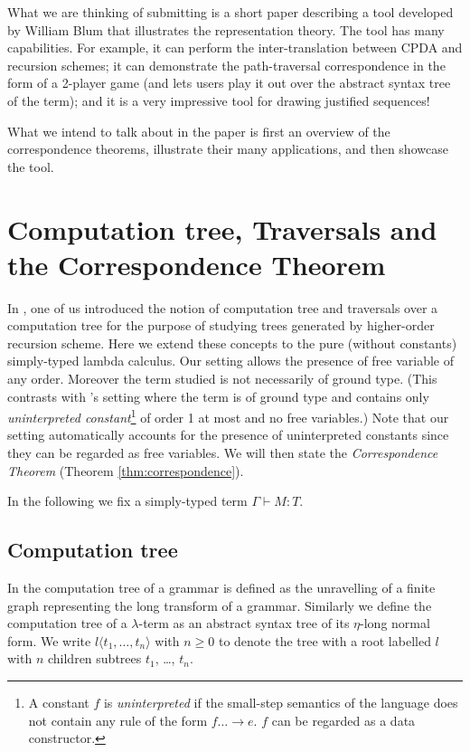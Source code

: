 What we are thinking of submitting is a short paper describing a tool developed by William Blum that illustrates the representation theory. The tool has many capabilities. For example, it can perform the inter-translation between CPDA and recursion schemes; it can demonstrate the path-traversal correspondence in the form of a 2-player game (and lets users play it out over the abstract syntax tree of the term); and it is a very impressive tool for drawing justified sequences!

What we intend to talk about in the paper is first an overview of the correspondence theorems, illustrate their many applications, and then showcase the tool.

\section{Computation tree, Traversals and the Correspondence Theorem}

In \cite{OngLics2006}, one of us introduced the notion of computation tree and traversals over a computation tree for the purpose of studying trees generated by higher-order recursion scheme. Here we extend these concepts to the pure (\ie without constants) simply-typed lambda calculus. Our setting allows the presence of free variable of any order. Moreover the term studied is not necessarily of ground type. (This contrasts with \cite{OngLics2006}'s setting where the term is of ground type and contains only \emph{uninterpreted constant}\footnote{A constant $f$ is  \emph{uninterpreted} if the small-step semantics of the language
  does not contain any rule of the form $f \dots \rightarrow e$. $f$
  can be regarded as a data constructor.} of order 1 at most and no
free variables.) Note that our setting automatically accounts for the presence of uninterpreted constants since they can be regarded as free variables. We will then state the \emph{Correspondence Theorem} (Theorem \ref{thm:correspondence}).

In the following we fix a simply-typed term $\Gamma \vdash M :T$.

\subsection{Computation tree}
 In \cite{OngLics2006} the computation tree of a grammar is
defined as the unravelling of a finite graph representing the long transform of a grammar. Similarly we define the computation tree of a $\lambda$-term as an abstract syntax tree of its $\eta$-long normal form.  We write $l\langle t_1, \ldots, t_n \rangle$ with $n \geq 0$ to denote the tree with a root labelled $l$ with $n$ children subtrees $t_1$, \ldots, $t_n$.

